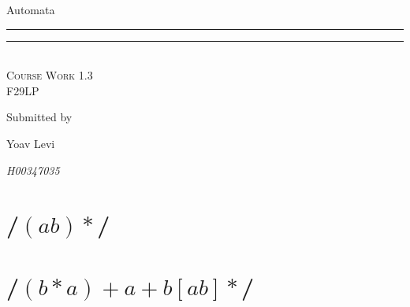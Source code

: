 \documentclass{article} %
\newlength{\drop}
\begin{document}
    \begin{titlepage}
        \textheight
        \centering
        \vspace*{\baselineskip}
        {\LARGE Automata}\\[0.2\baselineskip]
        \rule{\textwidth}{0.4pt}\vspace*{-\baselineskip}\vspace{3.2pt}
        \rule{\textwidth}{1.6pt}\\[\baselineskip]
        \scshape
        Course Work 1.3\\
        F29LP\par
        \vfill
        Submitted by \\[\baselineskip]
        {\Large Yoav Levi\par}
        {\itshape H00347035\par}
        \vspace*{8\baselineskip}
    \end{titlepage}

    \section{/$(ab)*$/} %
    \section{/$(b*a)+a+b[ab]*$/}
\end{document}
